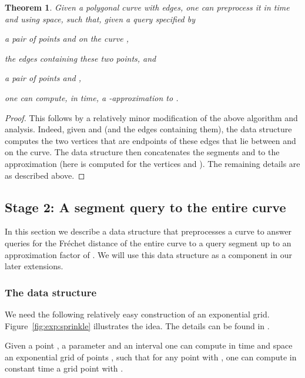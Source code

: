 \documentclass[12pt]{article}
\newtheorem{theorem}{Theorem}[section]
\newcommand{\seclab}[1]{\label{sec:#1}}
\newcommand{\thmlab}[1]{{\label{theo:#1}}}
\newcommand{\lemlab}[1]{\label{lemma:#1}}
\newcommand{\figref}[1]{Figure~\ref{fig:#1}}
\newcommand{\Frechet}{Fr\'{e}c{h}e{}t\xspace}\providecommand{\Arr}{\mathop{\mathrm{\EuScript{A}}}}
\numberwithin{figure}{section}
\numberwithin{equation}{section}
\begin{document}
\begin{theorem}\thmlab{data:structure:constant}Given a polygonal curve  with  edges, one can preprocess
    it in  time and using  space, such that,
    given a query specified by
    \begin{compactenum}[\quad(i)]
        \item a pair of points  and  on the curve ,
        \item the edges containing these two points, and
        \item a pair of points  and ,
    \end{compactenum}
    one can compute, in  time, a
    -approximation to .
\end{theorem}

\begin{proof}
    This follows by a relatively minor modification of the above
    algorithm and analysis. Indeed, given  and  (and the edges
    containing them), the data structure computes the two vertices
     that are endpoints of these edges that lie between 
    and  on the curve. The data structure then concatenates the
    segments  and  to the approximation  (here
     is computed for the vertices  and ).  The remaining
    details are as described above.
\end{proof}


\subsection{Stage 2: A segment query to the entire curve}
\seclab{queries:stage:two}

In this section we describe a data structure that preprocesses a curve
to answer queries for the \Frechet distance of the entire curve to a
query segment up to an approximation factor of . We will use
this data structure as a component in our later extensions.



\subsubsection{The data structure}

We need the following relatively easy construction of an exponential
grid. \figref{exp:sprinkle} illustrates the idea.
The details can be found in \cite{d-raapg-13}. 
\begin{lemma}\lemlab{exp:grid}
    Given a point , a parameter  and an interval
     one can compute in  time and space an exponential grid of points , 
    such that for any point  with ,
    one can compute in constant time a grid point  with 
    .
\end{lemma}
\end{document}
